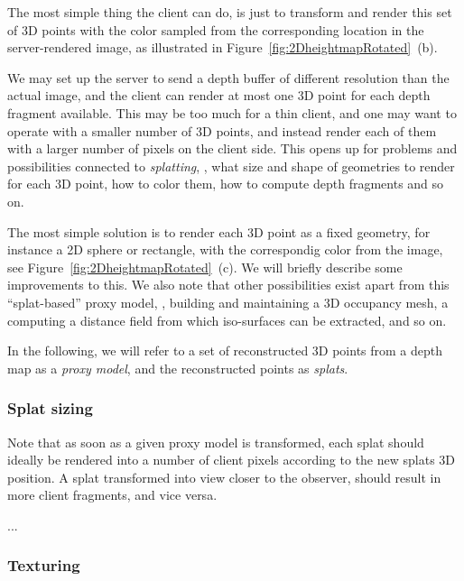 The most simple thing the client can do, is just to transform and render this
set of 3D points with the color sampled from the corresponding location in the
server-rendered image, as illustrated in
Figure~\ref{fig:2DheightmapRotated}~(b).

We may set up the server to send a depth buffer of different resolution than the
actual image, and the client can render at most one 3D point for each depth
fragment available. This may be too much for a thin client, and one may want to
operate with a smaller number of 3D points, and instead render each of them with
a larger number of pixels on the client side. This opens up for problems and
possibilities connected to {\em splatting}, \eg, what size and shape of
geometries to render for each 3D point, how to color them, how to compute depth
fragments and so on.

The most simple solution is to render each 3D point as a fixed geometry, for
instance a 2D sphere or rectangle, with the correspondig color from the image,
see Figure~\ref{fig:2DheightmapRotated}~(c). We will briefly describe some
improvements to this. We also note that other possibilities exist apart
from this ``splat-based'' proxy model, \eg, building and maintaining a 3D
occupancy mesh, a computing a distance field from which iso-surfaces can be
extracted, and so on.

In the following, we will refer to a set of reconstructed 3D points from a depth
map as a {\em proxy model}, and the reconstructed points as {\em splats}.

\subsubsection{Splat sizing}

Note that as soon as a given proxy model is transformed, each splat should
ideally be rendered into a number of client pixels according to the new splats
3D position. A splat transformed into view closer to the observer, should result
in more client fragments, and vice versa. 

...



\subsubsection{Texturing}

